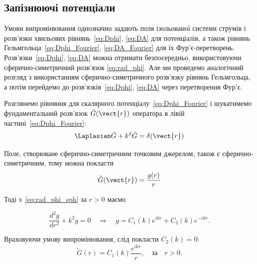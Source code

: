 \subsection*{Запізнюючі потенціали}


Умови випромінювання однозначно задають поля ізольованої системи струмів і розв'язки хвильових рівнянь~\eqref{eq:Dphi},
\eqref{eq:DA} для потенціалів, а також рівнянь Гельмгольца~\eqref{eq:Dphi_Fourier}, \eqref{eq:DA_Fourier} для їх
Фур'є-перетворень. Розв'язки~\eqref{eq:Dphi}, \eqref{eq:DA} можна отримати безпосередньо, використовуючи
сфе\-рич\-но-симетричний розв'язок \eqref{eq:rad_phi}. Але ми проведемо аналогічний розгляд з використанням
сфе\-рич\-но-симетричного розв'язку рівнянь Гельмгольца, а потім перейдемо до розв'язків~\eqref{eq:Dphi}, \eqref{eq:DA}
через перетворення Фур'є.

Розглянемо рівняння для скалярного потенціалу~\eqref{eq:Dphi_Fourier} і шукатимемо фундаментальний розв'язок
$\tilde{G}(\vect{r})$ оператора в лівій частині~\eqref{eq:Dphi_Fourier}:
\begin{equation*}
	\Laplasian\tilde{G} + k^2\tilde{G} = \delta(\vect{r})
\end{equation*}

Поле, створюване сферично-симетричним точковим джерелом, також є сферично-симетричним, тому можна покласти
\begin{equation*}
	\tilde{G} (\vect{r}) = \frac{g(r)}{r}
\end{equation*}

Тоді з~\eqref{eq:rad_phi_sph} за $r>0$ маємо

\begin{equation*}
	\frac{d^2 g}{dr^2} + k^2 g = 0 \quad \Rightarrow \quad g = C_1(k) e^{ikr} + C_2(k) e^{-ikr}.
\end{equation*}

Враховуючи умову випромінювання, слід покласти $C_2(k)=0$:
\begin{equation*}
	\tilde{G}(r) = C_1(k) \frac{e^{ikr}}{r}, \quad \text{за} \quad r>0.
\end{equation*}

